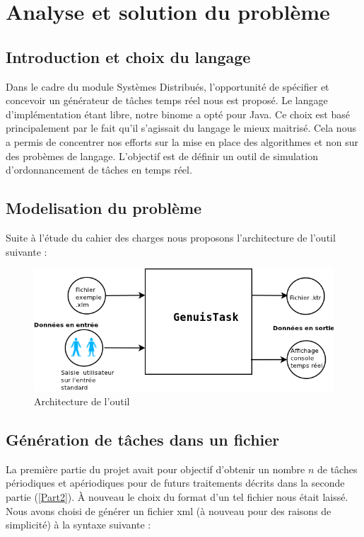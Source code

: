 \chapter{Analyse et solution du problème}

\section{Introduction et choix du langage}
Dans le cadre du module Systèmes Distribués, l'opportunité de  spécifier et concevoir  un générateur de tâches temps réel nous est proposé. Le langage d'implémentation étant libre, notre binome a opté pour Java. Ce choix est basé principalement par le fait qu'il s'agissait du langage le mieux maitrisé. Cela nous a permis de concentrer nos efforts sur la mise en place des algorithmes et non sur des probèmes de langage.
 L'objectif est de définir un outil de simulation  d'ordonnancement de tâches en temps réel.

\section{Modelisation du problème}
Suite à l'étude du cahier des charges nous proposons l'architecture de l'outil suivante :
   \begin{figure}[htbp]
  \centering
  \includegraphics[scale=0.70]{img/archi}
  \caption{Architecture de l'outil}
  \label{fig:archi}
\end{figure}
\section{Génération de tâches dans un fichier}
La première partie du projet avait pour objectif d'obtenir un nombre $n$ de tâches périodiques et apériodiques pour de futurs traitements décrits dans la seconde partie (\ref{Part2}). \`A nouveau le choix du format d'un tel fichier nous était laissé. Nous avons choisi de générer un fichier xml (à nouveau pour des raisons  de simplicité) à la syntaxe suivante : 

